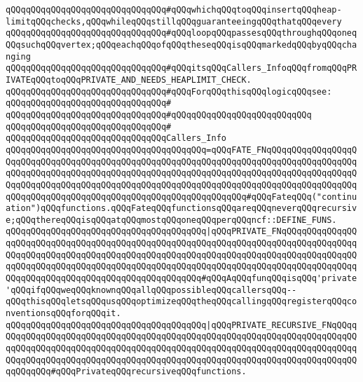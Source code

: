 \verb|qQQqqQQqqQQqqQQqqQQqqQQqqQQqqQQq#qQQqwhichqQQqtoqQQqinsertqQQqheap-limitqQQqchecks,qQQqwhileqQQqstillqQQqguaranteeingqQQqthatqQQqevery|\newline
\verb|qQQqqQQqqQQqqQQqqQQqqQQqqQQqqQQq#qQQqloopqQQqpassesqQQqthroughqQQqoneqQQqsuchqQQqvertex;qQQqeachqQQqofqQQqtheseqQQqisqQQqmarkedqQQqbyqQQqchanging|\newline
\verb|qQQqqQQqqQQqqQQqqQQqqQQqqQQqqQQq#qQQqitsqQQqCallers_InfoqQQqfromqQQqPRIVATEqQQqtoqQQqPRIVATE_AND_NEEDS_HEAPLIMIT_CHECK.|\newline
\verb|qQQqqQQqqQQqqQQqqQQqqQQqqQQqqQQq#qQQqForqQQqthisqQQqlogicqQQqsee:|\newline
\verb|qQQqqQQqqQQqqQQqqQQqqQQqqQQqqQQq#|\newline
\verb|qQQqqQQqqQQqqQQqqQQqqQQqqQQqqQQq#qQQqqQQqqQQqqQQqqQQqqQQqqQQq|\newline
\verb|qQQqqQQqqQQqqQQqqQQqqQQqqQQqqQQq#|\newline
\verb|qQQqqQQqqQQqqQQqqQQqqQQqqQQqqQQqCallers_Info|\newline
\verb|qQQqqQQqqQQqqQQqqQQqqQQqqQQqqQQqqQQqqQQq=qQQqFATE_FNqQQqqQQqqQQqqQQqqQQqqQQqqQQqqQQqqQQqqQQqqQQqqQQqqQQqqQQqqQQqqQQqqQQqqQQqqQQqqQQqqQQqqQQqqQQqqQQqqQQqqQQqqQQqqQQqqQQqqQQqqQQqqQQqqQQqqQQqqQQqqQQqqQQqqQQqqQQqqQQqqQQqqQQqqQQqqQQqqQQqqQQqqQQqqQQqqQQqqQQqqQQqqQQqqQQqqQQqqQQqqQQqqQQqqQQqqQQqqQQqqQQqqQQqqQQqqQQqqQQqqQQqqQQqqQQqqQQq#qQQqFateqQQq("continuation")qQQqfunctions.qQQqFateqQQqfunctionsqQQqareqQQqneverqQQqrecursive;qQQqthereqQQqisqQQqatqQQqmostqQQqoneqQQqperqQQqncf::DEFINE_FUNS.|\newline
\verb|qQQqqQQqqQQqqQQqqQQqqQQqqQQqqQQqqQQqqQQq|\verb#|qQQqPRIVATE_FNqQQqqQQqqQQqqQQqqQQqqQQqqQQqqQQqqQQqqQQqqQQqqQQqqQQqqQQqqQQqqQQqqQQqqQQqqQQqqQQqqQQqqQQqqQQqqQQqqQQqqQQqqQQqqQQqqQQqqQQqqQQqqQQqqQQqqQQqqQQqqQQqqQQqqQQqqQQqqQQqqQQqqQQqqQQqqQQqqQQqqQQqqQQqqQQqqQQqqQQqqQQqqQQqqQQqqQQqqQQqqQQqqQQqqQQqqQQqqQQqqQQqqQQqqQQqqQQqqQQqqQQq#\verb|#qQQqAqQQqfunqQQqisqQQq'private'qQQqifqQQqweqQQqknownqQQqallqQQqpossibleqQQqcallersqQQq--qQQqthisqQQqletsqQQqusqQQqoptimizeqQQqtheqQQqcallingqQQqregisterqQQqconventionsqQQqforqQQqit.|\newline
\verb|qQQqqQQqqQQqqQQqqQQqqQQqqQQqqQQqqQQqqQQq|\verb#|qQQqPRIVATE_RECURSIVE_FNqQQqqQQqqQQqqQQqqQQqqQQqqQQqqQQqqQQqqQQqqQQqqQQqqQQqqQQqqQQqqQQqqQQqqQQqqQQqqQQqqQQqqQQqqQQqqQQqqQQqqQQqqQQqqQQqqQQqqQQqqQQqqQQqqQQqqQQqqQQqqQQqqQQqqQQqqQQqqQQqqQQqqQQqqQQqqQQqqQQqqQQqqQQqqQQqqQQqqQQqqQQqqQQqqQQqqQQqqQQqqQQq#\verb|#qQQqPrivateqQQqrecursiveqQQqfunctions.|\newline
